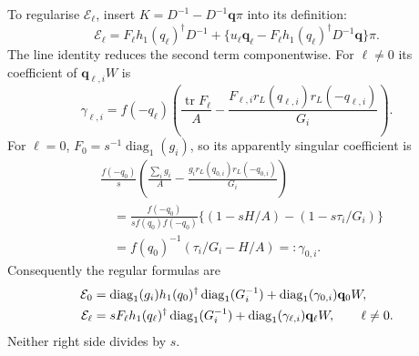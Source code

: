 \documentclass[11pt,reqno]{amsart}
\numberwithin{equation}{section}
\theoremstyle{definition}
\theoremstyle{remark}
\DeclareMathOperator{\tr}{tr}
\begin{document}
To regularise \(\mathcal E_\ell\), insert
\(K=D^{-1}-D^{-1}\mathbf q\pi\) into its definition:
\[
 \mathcal E_\ell=F_\ell h_1(q_\ell)^\dagger D^{-1}
       +\{u_\ell\mathbf q_\ell
                -F_\ell h_1(q_\ell)^\dagger D^{-1}\mathbf q\}\pi.
\]
The line identity reduces the second term componentwise.
For \(\ell\ne0\) its coefficient of \(\mathbf q_{\ell,i}W\) is
\[
 \gamma_{\ell,i}=f(-q_\ell)
       \left(\frac{\tr F_\ell}{A}
        -\frac{F_{\ell,i}r_L(q_{\ell,i})r_L(-q_{\ell,i})}{G_i}\right).
\]
For \(\ell=0\), \(F_0=s^{-1}\operatorname{diag}_1(g_i)\),
so its apparently singular coefficient is
\begin{align*}
 &\frac{f(-q_0)}s
        \left(\frac{\sum_i g_i}{A}
                -\frac{g_i r_L(q_{0,i})r_L(-q_{0,i})}{G_i}\right)\\
 &\quad=\frac{f(-q_0)}{s f(q_0)f(-q_0)}
                    \{(1-sH/A)-(1-s\tau_i/G_i)\}\\
 &\quad=f(q_0)^{-1}(\tau_i/G_i-H/A)=:\gamma_{0,i}.
\end{align*}
Consequently the regular formulas are
\begin{align}
 \mathcal E_0&=\operatorname{diag}_1(g_i)h_1(q_0)^\dagger
                    \operatorname{diag}_1(G_i^{-1})
                         +\operatorname{diag}_1(\gamma_{0,i})\mathbf q_0W,
                                                        \notag\\
 \mathcal E_\ell&=sF_\ell h_1(q_\ell)^\dagger
                    \operatorname{diag}_1(G_i^{-1})
                         +\operatorname{diag}_1(\gamma_{\ell,i})\mathbf q_\ell W,
                                      \qquad\ell\ne0.
 \label{eq:calibration-filled-E-column}
\end{align}
Neither right side divides by \(s\).
\end{document}
